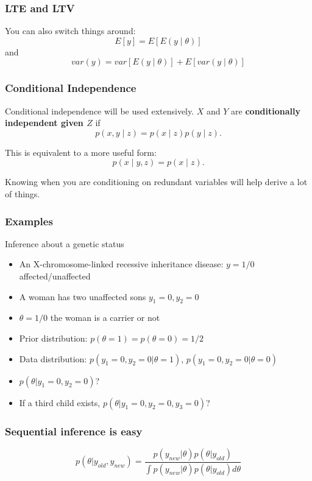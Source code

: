 \documentclass{beamer}
\begin{document}
\begin{frame}
\frametitle{LTE and LTV}

You can also switch things around:
\[
E[y] = E[E(y \mid \theta)]
\]
and
\[
var(y) = var[ E(y \mid \theta) ] + E[ var(y \mid \theta)]
\]
\end{frame}


\begin{frame}
\frametitle{Conditional Independence}

Conditional independence will be used extensively. $X$ and $Y$ are {\bf conditionally independent given $Z$} if $$
p(x,y \mid z) = p(x \mid z) p(y \mid z).
$$

This is equivalent to a more useful form:
$$
p(x \mid y, z) = p(x \mid z).
$$

Knowing when you are conditioning on redundant variables will help derive a lot of things.

\end{frame}


\begin{frame}
\frametitle{Examples}
Inference about a genetic status
\begin{itemize}
\item An X-chromosome-linked recessive inheritance disease: $y = 1/0$
  affected/unaffected
\item A woman has two unaffected sons $y_1 = 0, y_2 = 0$
\item $\theta = 1/0$ the woman is a carrier or not
\pause
\item Prior distribution: $p(\theta = 1) = p(\theta = 0) = 1/2$
\item Data distribution: $p(y_1 = 0, y_2 = 0|\theta = 1)$, $p(y_1 = 0,
  y_2 = 0|\theta = 0)$
\pause
\item $p(\theta|y_1 = 0, y_2 = 0)$?
\pause
\item If a third child exists, $p(\theta|y_1 = 0, y_2 = 0, y_3 = 0)$?
\end{itemize}
\end{frame}


\begin{frame}
  \frametitle{Sequential inference is easy}
\[
 p(\theta|y_{old}, y_{new}) = \frac{p(y_{new}|\theta) p(\theta|y_{old})}{\int p(y_{new}|\theta) p(\theta|y_{old}) d\theta}
\]  
\end{frame}
\end{document}
